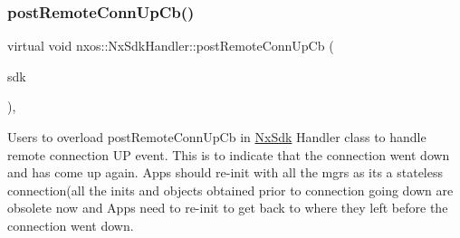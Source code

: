 \subsubsection{\texorpdfstring{post\+Remote\+Conn\+Up\+Cb()}{postRemoteConnUpCb()}}
{\footnotesize\ttfamily virtual void nxos\+::\+Nx\+Sdk\+Handler\+::post\+Remote\+Conn\+Up\+Cb (\begin{DoxyParamCaption}\item[{\mbox{\hyperlink{classnxos_1_1_nx_sdk}{Nx\+Sdk}} $\ast$}]{sdk }\end{DoxyParamCaption})\hspace{0.3cm}{\ttfamily [inline]}, {\ttfamily [virtual]}}

Users to overload post\+Remote\+Conn\+Up\+Cb in \mbox{\hyperlink{classnxos_1_1_nx_sdk}{Nx\+Sdk}} Handler class to handle remote connection UP event. This is to indicate that the connection went down and has come up again. Apps should re-\/init with all the mgrs as its a stateless connection(all the inits and objects obtained prior to connection going down are obsolete now and Apps need to re-\/init to get back to where they left before the connection went down.


